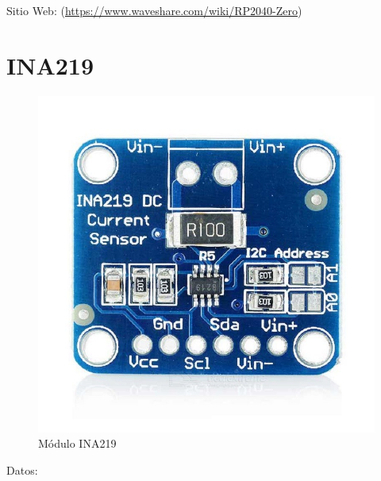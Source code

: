                 Sitio Web: (\href{https://www.waveshare.com/wiki/RP2040-Zero}{https://www.waveshare.com/wiki/RP2040-Zero})\par
        
        \newpage
        
        \section{INA219}
        \label{ina219}
                \begin{figure}[!ht]
                    \centering
                    \includegraphics[width=0.7\linewidth]{Imagenes/Anexo_C/INA219.png}
                    \caption{Módulo INA219}
                    \label{fig:c2}
                \end{figure}
            
                Datos:\par
            
